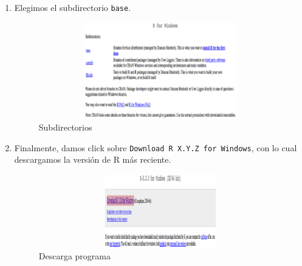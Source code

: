 \documentclass[11pt,a4paper,oneside]{book}\usepackage[]{graphicx}\usepackage[]{color}
\begin{document}
\begin{enumerate}
  \item Elegimos el subdirectorio \texttt{base}.
  \begin{figure}[H]
    \centering
    \includegraphics[width=11.5cm,height=4.2cm]{figuras/install4.eps}
    \caption{Subdirectorios}
    \label{subdirectorio}
  \end{figure}
  
  \item Finalmente, damos click sobre \texttt{Download R X.Y.Z for Windows}, con lo cual descargamos la versión de R más reciente.
  \begin{figure}[H]
    \centering
    \includegraphics[width=11.5cm,height=3.2cm]{figuras/install5.eps}
    \caption{Descarga programa}
    \label{download}
  \end{figure}
\end{enumerate}
\end{document}
